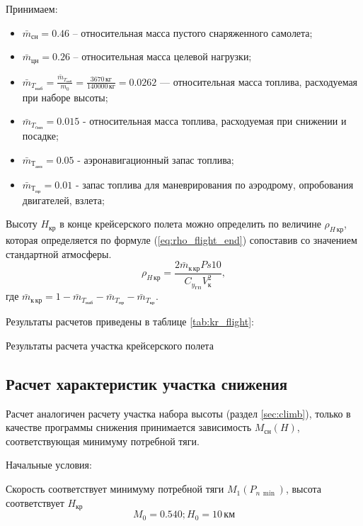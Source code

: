 Принимаем:
\begin{itemize}
    \item $\bar{m}_{сн} = 0.46$ – относительная масса пустого снаряженного самолета;
    \item $\bar{m}_{цн} =0.26$ – относительная масса целевой нагрузки;
    \item $\bar{m}_{T_{наб}} = \frac{\bar{m}_{T_{наб}}}{m_0} = \frac{3670\,
        \text{кг}}{140000\, \text{кг}} = 0.0262$ --- относительная масса
        топлива, расходуемая при наборе высоты;
    \item $\bar{m}_{T_{cнп}} =0.015$ - относительная масса топлива, расходуемая при
        снижении и посадке;
    \item $\bar{m}_{Т_{анз}} = 0.05$ - аэронавигационный запас топлива;
    \item $\bar{m}_{Т_{пр}} = 0.01$ - запас топлива для маневрирования по аэродрому, опробования
        двигателей, взлета;
\end{itemize}

Высоту $H_{кр}$ в конце крейсерского полета можно определить по величине
$\rho_{H\, кр}$, которая определяется по формуле (\ref{eq:rho_flight_end})
сопоставив со значением стандартной атмосферы.
\begin{equation}
    \rho_{H\, {кр}} = \frac{2 \bar{m}_{к\, кр} Ps 10 }{C_{y_{ГП}} V_к^2},
    \label{eq:rho_flight_end}
\end{equation}
где $\bar{m}_{к\, кр} = 1 - \bar{m}_{T_{наб}} - \bar{m}_{T_{пр}} -
\bar{m}_{T_{кр}}$.

Результаты расчетов приведены в таблице \ref{tab:kr_flight}:

\begin{table}[H]
    \centering
    \caption{Результаты расчета участка крейсерского полета}
    \label{tab:kr_flight}
    
\end{table}

\subsection{Расчет характеристик участка снижения}\label{sec:descent}

Расчет аналогичен расчету участка набора высоты (раздел \ref{sec:climb}),
только в качестве программы снижения принимается зависимость $M_{сн}(H)$,
соответствующая минимуму потребной тяги.

Начальные условия:

Скорость соответствует минимуму потребной тяги $M_1(P_{n\, \min})$, высота соответствует $H_{кр}$
\[
    M_0=0.540; H_0 = 10\, \text{км}
\]

